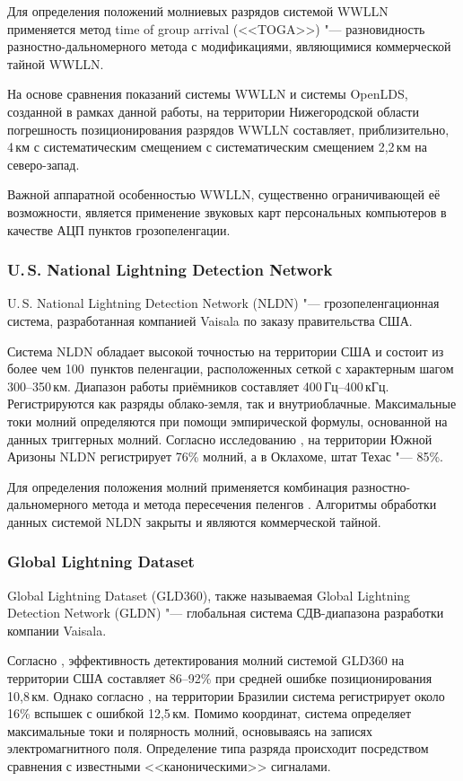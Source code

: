 Для определения положений молниевых разрядов системой WWLLN применяется метод time of group arrival (<<TOGA>>) "--- разновидность разностно-дальномерного метода с модификациями, являющимися коммерческой тайной WWLLN.

На основе сравнения показаний системы WWLLN и системы OpenLDS, созданной в рамках данной работы, на территории Нижегородской области погрешность позиционирования разрядов WWLLN составляет, приблизительно, 4\,км с систематическим смещением с систематическим смещением 2,2\,км на северо-запад\cite{BulatovMiG}.

Важной аппаратной особенностью WWLLN, существенно ограничивающей её возможности, является применение звуковых карт персональных компьютеров в качестве АЦП пунктов грозопеленгации.

\subsubsection{U.\,S. National Lightning Detection Network}
U.\,S. National Lightning Detection Network\cite{nldnSiteArticle} (NLDN) "--- грозопеленгационная система, разработанная компанией Vaisala по заказу правительства США.

Система NLDN обладает высокой точностью на территории США и состоит из более чем 100~пунктов пеленгации, расположенных сеткой с характерным шагом 300--350\,км. Диапазон работы приёмников составляет 400\,Гц--400\,кГц. Регистрируются как разряды облако-земля, так и внутриоблачные. Максимальные токи молний определяются при помощи эмпирической формулы, основанной на данных триггерных молний. Согласно исследованию \cite{Biagi2007}, на территории Южной Аризоны NLDN регистрирует 76\% молний, а в Оклахоме, штат Техас "--- 85\%. \cite{Rakov-emld}

Для определения положения молний применяется комбинация разностно-дальномерного метода и метода пересечения пеленгов \cite{Rakov-emld}. Алгоритмы обработки данных системой NLDN закрыты и являются коммерческой тайной. 

\subsubsection{Global Lightning Dataset }
Global Lightning Dataset (GLD360), также называемая Global Lightning Detection Network (GLDN) "--- глобальная система СДВ-диапазона разработки компании Vaisala. 

Согласно \cite{Demetriades2010}, эффективность детектирования молний системой GLD360 на территории США составляет 86–92\% при средней ошибке позиционирования 10,8\,км. Однако согласно \cite{Naccarato2010}, на территории Бразилии система регистрирует около 16\% вспышек с ошибкой 12,5\,км. Помимо координат, система определяет максимальные токи и полярность молний, основываясь на записях электромагнитного поля. Определение типа разряда происходит посредством сравнения с известными <<каноническими>> сигналами. \cite{Rakov-emld}

